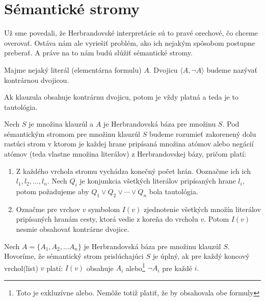 \section{Sémantické stromy}

Už sme povedali, že Herbrandovské interpretácie sú to pravé orechové,
čo chceme overovať. Ostáva nám ale vyriešiť problém, ako ich nejakým
spôsobom postupne preberať. A práve na to nám budú slúžiť sémantické
stromy.

\begin{definicia}
    Majme nejaký literál (elementárna formulu) $A$. Dvojicu
    $\langle A, \neg A \rangle$ budeme nazývať kontrárnou dvojicou.

    Ak klauzula obsahuje kontrárnu dvojicu, potom je vždy platná a
    teda je to tautológia.
\end{definicia}

\begin{definicia}
    Nech $S$ je množina klauzúl a $A$ je Herbrandovská báza pre
    množinu $S$. Pod sémantickým stromom pre množinu klauzúl $S$
    budeme rozumieť zakorenený dolu rastúci strom
    v ktorom je každej hrane pripísaná množina atómov alebo negácií
    atómov (teda vlastne množina literálov) z Herbrandovskej bázy,
    pričom platí:
    \begin{enumerate}
        \item Z každého vrchola stromu vychádza konečný počet hrán.
            Ooznačme ich ich $l_1, l_2, \dots, l_n$.
            Nech $Q_i$ je konjunkcia všetkých literálov
            pripísaných hrane $l_i$, potom požadujeme aby 
            $Q_1 \lor Q_2 \lor \cdots \lor Q_n$ bola tautológia.

        \item Označme pre vrchov $v$ symbolom $I(v)$
            zjednotenie všetkých množín literálov pripísaných hranám cesty,
            ktorá vedie z koreňa do vrcholu $v$. Potom $I(v)$
            nesmie obsahovať kontrárne dvojice.
    \end{enumerate}
\end{definicia}

\begin{definicia}
    Nech $A=\{ A_1, A_2, \ldots A_n \}$ je Herbrandovská báza pre množinu
    klauzúl $S$.
    Hovoríme, že sémantický strom prislúchajúci $S$ je úplný,
    ak pre každý koncový vrchol(list) $v$ platí:
    $I(v)$ obsahuje $A_i$ alebo\footnote{Toto je exkluzívne alebo. Nemôže
    totiž platiť, že by obsahovala obe formuly} $\neg A_i$ pre každé $i$.
\end{definicia}

